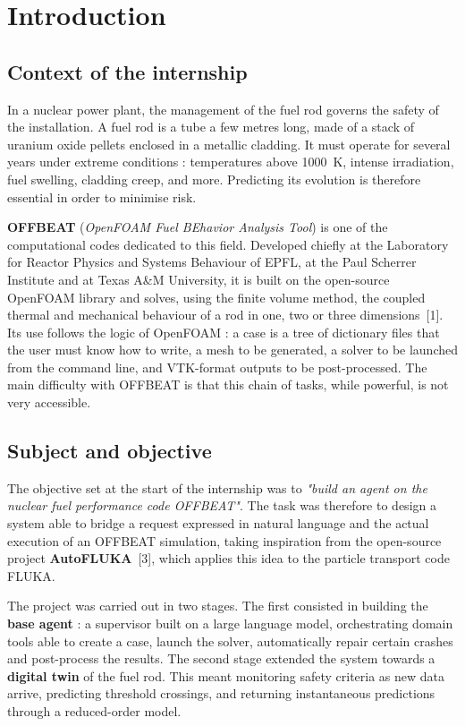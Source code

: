 \documentclass[12pt,a4paper]{report}
\begin{document}
\chapter*{Introduction}

\section*{Context of the internship}

In a nuclear power plant, the management of the fuel rod governs the safety of
the installation. A fuel rod is a tube a few metres long, made of a stack of
uranium oxide pellets enclosed in a metallic cladding. It must operate for
several years under extreme conditions : temperatures above \SI{1000}{\kelvin},
intense irradiation, fuel swelling, cladding creep, and more. Predicting its
evolution is therefore essential in order to minimise risk.

\textbf{OFFBEAT} (\textit{OpenFOAM Fuel BEhavior Analysis Tool}) is one of the
computational codes dedicated to this field. Developed chiefly at the Laboratory
for Reactor Physics and Systems Behaviour of EPFL, at the Paul Scherrer
Institute and at Texas A\&M University, it is built on the open-source OpenFOAM
library and solves, using the finite volume method, the coupled thermal and
mechanical behaviour of a rod in one, two or three dimensions~[1]. Its use
follows the logic of OpenFOAM : a case is a tree of dictionary files that the
user must know how to write, a mesh to be generated, a solver to be launched
from the command line, and VTK-format outputs to be post-processed. The main
difficulty with OFFBEAT is that this chain of tasks, while powerful, is not very
accessible.

\section*{Subject and objective}

The objective set at the start of the internship was to \textit{"build an agent
on the nuclear fuel performance code OFFBEAT"}. The task was therefore to design
a system able to bridge a request expressed in natural language and the actual
execution of an OFFBEAT simulation, taking inspiration from the open-source
project \textbf{AutoFLUKA}~[3], which applies this idea to the particle
transport code FLUKA.

The project was carried out in two stages. The first consisted in building the
\textbf{base agent} : a supervisor built on a large language model, orchestrating
domain tools able to create a case, launch the solver, automatically repair
certain crashes and post-process the results. The second stage extended the
system towards a \textbf{digital twin} of the fuel rod. This meant monitoring
safety criteria as new data arrive, predicting threshold crossings, and
returning instantaneous predictions through a reduced-order model.
\end{document}
